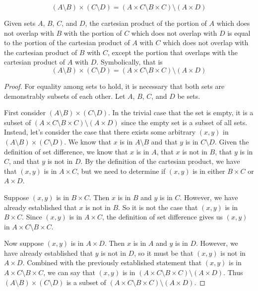 \documentclass[main.tex]{subfiles}
\begin{document}
\subproblem{}\label{2p}
\[(A \setminus B) \times (C \setminus D) = (A \times C \setminus B \times C) \setminus (A \times D)\]
\begin{thm}
	Given sets \(A\), \(B\), \(C\), and \(D\), the cartesian product of the
	portion of \(A\) which does not overlap with \(B\) with the portion of
	\(C\) which does not overlap with \(D\) is equal to the portion of the
	cartesian product of \(A\) with \(C\) which does not overlap with the
	cartesian product of \(B\) with \(C\), except the portion that overlaps
	with the cartesian product of \(A\) with \(D\). Symbolically, that is
	\[(A \setminus B) \times (C \setminus D) = (A \times C \setminus B \times C) \setminus (A \times D)\]
\end{thm}
\begin{proof}
	For equality among sets to hold, it is necessary that both sets are
	demonstrably subsets of each other. Let \(A\), \(B\), \(C\), and \(D\)
	be sets.

	\medskip
	First consider \((A \setminus B) \times (C \setminus D)\). In the
	trivial case that the set is empty, it is a subset of
	\((A \times C \setminus B \times C) \setminus (A \times D)\) since the
	empty set is a subset of all sets. Instead, let's consider the case that
	there exists some arbitrary \((x,y)\) in
	\((A \setminus B) \times (C \setminus D)\). We know that \(x\) is in
	\(A \setminus B\) and that \(y\) is in \(C \setminus D\). Given the
	definition of set difference, we know that \(x\) is in \(A\), that \(x\)
	is not in \(B\), that \(y\) is in \(C\), and that \(y\) is not in \(D\).
	By the definition of the cartesian product, we have that \((x,y)\) is in
	\(A \times C\), but we need to determine if \((x,y)\) is in either
	\(B \times C\) or \(A \times D\).

	Suppose \((x,y)\) is in \(B \times C\). Then \(x\) is in \(B\) and \(y\)
	is in \(C\). However, we have already established that \(x\) is not in
	\(B\). So it is not the case that \((x,y)\) is in \(B \times C\). Since
	\((x,y)\) is in \(A \times C\), the definition of set difference gives
	us \((x,y)\) in \(A \times C \setminus B \times C\).

	Now suppose \((x,y)\) is in \(A \times D\). Then \(x\) is in \(A\) and
	\(y\) is in \(D\). However, we have already established that \(y\) is
	not in \(D\), so it must be that \((x,y)\) is not in \(A \times D\).
	Combined with the previously established statement that \((x,y)\) is in
	\(A \times C \setminus B \times C\), we can say that \((x,y)\) is in
	\((A \times C \setminus B \times C) \setminus (A \times D)\). Thus
	\((A \setminus B) \times (C \setminus D)\) is a subset of
	\((A \times C \setminus B \times C) \setminus (A \times D)\).


\end{proof}
\end{document}
